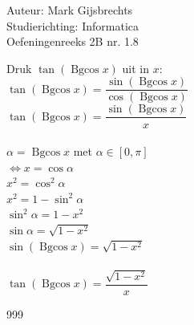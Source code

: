 \documentclass[a4paper]{article}
\newcommand{\Bgcos}{\operatorname{Bgcos}}
\begin{document}
\noindent \large Auteur: Mark Gijsbrechts \\
\noindent \large Studierichting: Informatica\\
\noindent \large Oefeningenreeks 2B nr. 1.8\\

\medskip

\normalsize

Druk $\tan(\Bgcos x)$ uit in $x$:\\

$\tan(\Bgcos x) = \dfrac{\sin(\Bgcos x)}{\cos(\Bgcos x)}$ \\

$\tan(\Bgcos x) = \dfrac{\sin(\Bgcos x)}{x}$ \\ \\

$\alpha = \Bgcos x$ met $\alpha \in \left[ 0, \pi \right]$ \\

$\Leftrightarrow x = \cos \alpha$  \\

$x^2 = \cos^2 \alpha$ \\

$x^2 = 1 - \sin^2 \alpha$ \\

$ \sin^2 \alpha = 1 - x^2$ \\

$ \sin \alpha = \sqrt{1 - x^2}$ \\

$ \sin(\Bgcos x) = \sqrt{1 - x^2}$ \\ \\

$\tan(\Bgcos x) = \dfrac{\sqrt{1 - x^2}}{x}$ \\


\begin{thebibliography}{999}
\end{thebibliography}
\end{document}
